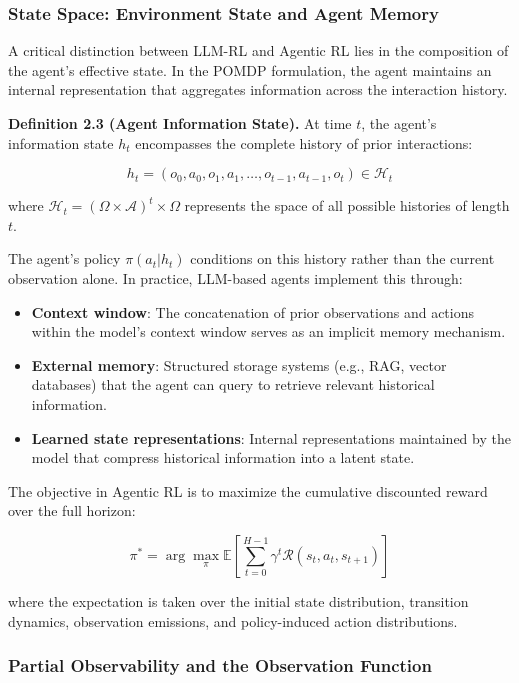 \subsubsection{State Space: Environment State and Agent Memory}

A critical distinction between LLM-RL and Agentic RL lies in the composition of the agent's effective state. In the POMDP formulation, the agent maintains an internal representation that aggregates information across the interaction history.

\textbf{Definition 2.3 (Agent Information State).} At time $t$, the agent's information state $h_t$ encompasses the complete history of prior interactions:

$$h_t = (o_0, a_0, o_1, a_1, \ldots, o_{t-1}, a_{t-1}, o_t) \in \mathcal{H}_t$$

where $\mathcal{H}_t = (\Omega \times \mathcal{A})^t \times \Omega$ represents the space of all possible histories of length $t$.

The agent's policy $\pi(a_t | h_t)$ conditions on this history rather than the current observation alone. In practice, LLM-based agents implement this through:

\begin{itemize}
    \item \textbf{Context window}: The concatenation of prior observations and actions within the model's context window serves as an implicit memory mechanism.
    \item \textbf{External memory}: Structured storage systems (e.g., RAG, vector databases) that the agent can query to retrieve relevant historical information.
    \item \textbf{Learned state representations}: Internal representations maintained by the model that compress historical information into a latent state.

\end{itemize}
The objective in Agentic RL is to maximize the cumulative discounted reward over the full horizon:

$$\pi^* = \arg\max_{\pi} \mathbb{E}\left[\sum_{t=0}^{H-1} \gamma^t \mathcal{R}(s_t, a_t, s_{t+1}) \right]$$

where the expectation is taken over the initial state distribution, transition dynamics, observation emissions, and policy-induced action distributions.

\subsubsection{Partial Observability and the Observation Function}

